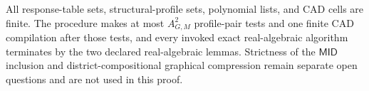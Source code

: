 All response-table sets, structural-profile sets, polynomial lists, and CAD cells are finite.  The procedure makes at most \(A_{G,M}^2\) profile-pair tests and one finite CAD compilation after those tests, and every invoked exact real-algebraic algorithm terminates by the two declared real-algebraic lemmas.  Strictness of the \(\mathsf{MID}\) inclusion and district-compositional graphical compression remain separate open questions and are not used in this proof.